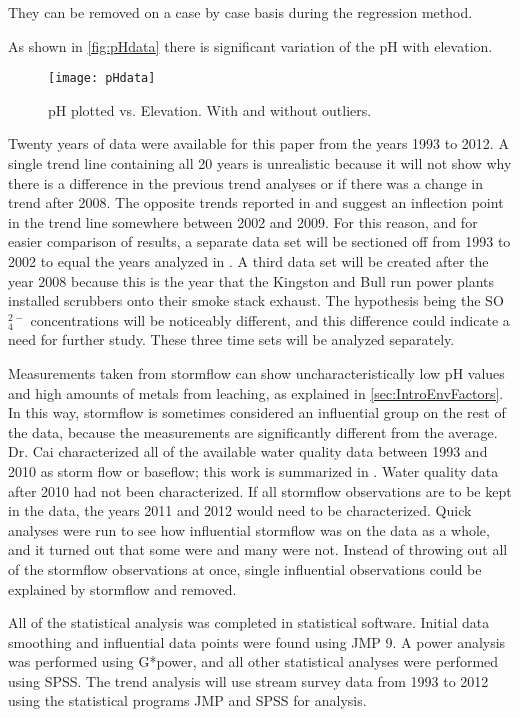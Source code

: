 They can be removed on a case by case basis during the regression method.


As shown in \autoref{fig:pHdata} there is significant variation of the pH with elevation.
\begin{figure}[h!]
\centering
  \texttt{[image: pHdata]}\\
  \caption{pH plotted vs. Elevation.  With and without outliers.}\label{fig:pHdata}
\end{figure}

Twenty years of data were available for this paper from the years 1993 to 2012. 
A single trend line containing all 20 years is unrealistic because it will not show why there is a difference in the previous trend analyses or if there was a change in trend after 2008. 
The opposite trends reported in  \citet{robinson2008ph} and \citet{cai2012} suggest an inflection point in the trend line somewhere between 2002 and 2009. For this reason, and for easier comparison of results,  a separate data set will be sectioned off from 1993 to 2002 to equal the years analyzed in \citet{robinson2008ph}.  
A third data set will be created after the year 2008 because this is the year that the Kingston and Bull run power plants installed scrubbers onto their smoke stack exhaust. 
The hypothesis being the SO$_4^{2-}$ concentrations will be noticeably different, and this difference could indicate a need for further study. 
These three time sets will be analyzed separately.

Measurements taken from stormflow can show uncharacteristically low pH values and high amounts of metals from leaching, as explained in \autoref{sec:IntroEnvFactors}.
In this way, stormflow is sometimes considered an influential group on the rest of the data, because the measurements are significantly different from the average. 
Dr. Cai characterized all of the available water quality data between 1993 and 2010 as storm flow or baseflow; this work is summarized in \citet{cai2012}. 
Water quality data after 2010 had not been characterized. If all stormflow observations are to be kept in the data, the years 2011 and 2012 would need to be characterized. 
Quick analyses were run to see how influential stormflow was on the data as a whole, and it turned out that some were and many were not. Instead of throwing out all of the stormflow observations at once, single influential observations could be explained by stormflow and removed. 



All of the statistical analysis was completed in statistical software. 
Initial data smoothing and influential data points were found using JMP 9. 
A power analysis was performed using G*power, and all other statistical analyses were performed using SPSS.
The trend analysis will use stream survey data from 1993 to 2012 using the statistical programs JMP and SPSS for analysis.






